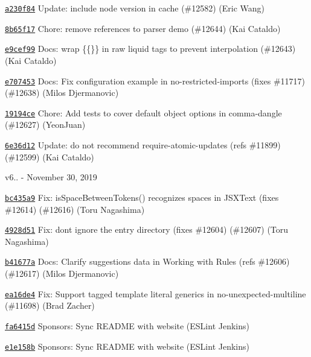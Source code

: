 \begin{DoxyItemize}
\item \href{https://github.com/eslint/eslint/commit/a230f8404e4f2423dd79378b065d24c12776775b}{\texttt{ {\ttfamily a230f84}}} Update\+: include node version in cache (\#12582) (Eric Wang)
\item \href{https://github.com/eslint/eslint/commit/8b65f175dfb4fac11ed7184537be400ed14996fb}{\texttt{ {\ttfamily 8b65f17}}} Chore\+: remove references to parser demo (\#12644) (Kai Cataldo)
\item \href{https://github.com/eslint/eslint/commit/e9cef99e6ebec1faefdb576ca597e81ae4f04afd}{\texttt{ {\ttfamily e9cef99}}} Docs\+: wrap \{\{\}\} in raw liquid tags to prevent interpolation (\#12643) (Kai Cataldo)
\item \href{https://github.com/eslint/eslint/commit/e70745325ff9e085acc6843dd8bfae5550645d4f}{\texttt{ {\ttfamily e707453}}} Docs\+: Fix configuration example in no-\/restricted-\/imports (fixes \#11717) (\#12638) (Milos Djermanovic)
\item \href{https://github.com/eslint/eslint/commit/19194cec724e016df02376bbeae31171be6f0bdf}{\texttt{ {\ttfamily 19194ce}}} Chore\+: Add tests to cover default object options in comma-\/dangle (\#12627) (Yeon\+Juan)
\item \href{https://github.com/eslint/eslint/commit/6e36d12d95e76022172fd0ec8a5e85c22fde6a8a}{\texttt{ {\ttfamily 6e36d12}}} Update\+: do not recommend require-\/atomic-\/updates (refs \#11899) (\#12599) (Kai Cataldo)
\end{DoxyItemize}

v6.. -\/ November 30, 2019


\begin{DoxyItemize}
\item \href{https://github.com/eslint/eslint/commit/bc435a93afd6ba4def1b53993ef7cf8220f3f070}{\texttt{ {\ttfamily bc435a9}}} Fix\+: is\+Space\+Between\+Tokens() recognizes spaces in JSXText (fixes \#12614) (\#12616) (Toru Nagashima)
\item \href{https://github.com/eslint/eslint/commit/4928d513b4fe716c7ed958c294a10ef8517be25e}{\texttt{ {\ttfamily 4928d51}}} Fix\+: don\textquotesingle{}t ignore the entry directory (fixes \#12604) (\#12607) (Toru Nagashima)
\item \href{https://github.com/eslint/eslint/commit/b41677ae2a143790b19b0e70391a46ec6c8f5de1}{\texttt{ {\ttfamily b41677a}}} Docs\+: Clarify suggestion\textquotesingle{}s data in Working with Rules (refs \#12606) (\#12617) (Milos Djermanovic)
\item \href{https://github.com/eslint/eslint/commit/ea16de4e7c6f661398b0b7843f95e5f307c89551}{\texttt{ {\ttfamily ea16de4}}} Fix\+: Support tagged template literal generics in no-\/unexpected-\/multiline (\#11698) (Brad Zacher)
\item \href{https://github.com/eslint/eslint/commit/fa6415d5b877370374a6a530a5190ab5a411b4dc}{\texttt{ {\ttfamily fa6415d}}} Sponsors\+: Sync README with website (ESLint Jenkins)
\item \href{https://github.com/eslint/eslint/commit/e1e158b4d7bd61e812723b378d2c391295da43a5}{\texttt{ {\ttfamily e1e158b}}} Sponsors\+: Sync README with website (ESLint Jenkins)
\end{DoxyItemize}

